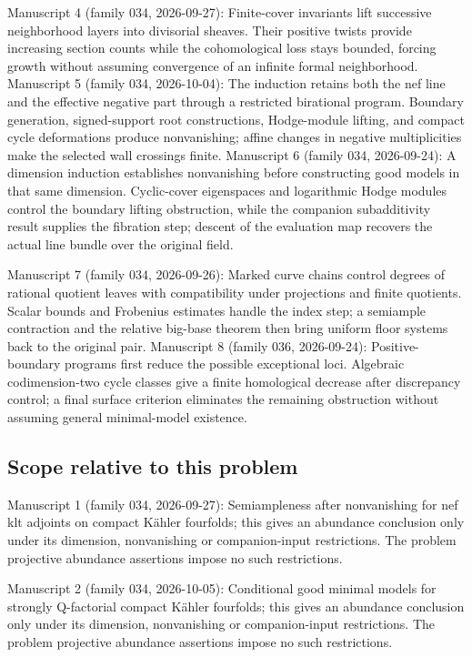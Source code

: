 \documentclass[11pt]{article}
\begin{document}
Manuscript 4 (family 034, 2026-09-27): Finite-cover invariants lift successive neighborhood layers into divisorial sheaves. Their positive twists provide increasing section counts while the cohomological loss stays bounded, forcing growth without assuming convergence of an infinite formal neighborhood. Manuscript 5 (family 034, 2026-10-04): The induction retains both the nef line and the effective negative part through a restricted birational program. Boundary generation, signed-support root constructions, Hodge-module lifting, and compact cycle deformations produce nonvanishing; affine changes in negative multiplicities make the selected wall crossings finite. Manuscript 6 (family 034, 2026-09-24): A dimension induction establishes nonvanishing before constructing good models in that same dimension. Cyclic-cover eigenspaces and logarithmic Hodge modules control the boundary lifting obstruction, while the companion subadditivity result supplies the fibration step; descent of the evaluation map recovers the actual line bundle over the original field.

Manuscript 7 (family 034, 2026-09-26): Marked curve chains control degrees of rational quotient leaves with compatibility under projections and finite quotients. Scalar bounds and Frobenius estimates handle the index step; a semiample contraction and the relative big-base theorem then bring uniform floor systems back to the original pair. Manuscript 8 (family 036, 2026-09-24): Positive-boundary programs first reduce the possible exceptional loci. Algebraic codimension-two cycle classes give a finite homological decrease after discrepancy control; a final surface criterion eliminates the remaining obstruction without assuming general minimal-model existence.

\subsection{Scope relative to this problem}
Manuscript 1 (family 034, 2026-09-27): Semiampleness after nonvanishing for nef klt adjoints on compact Kähler fourfolds; this gives an abundance conclusion only under its dimension, nonvanishing or companion-input restrictions. The problem projective abundance assertions impose no such restrictions.

Manuscript 2 (family 034, 2026-10-05): Conditional good minimal models for strongly Q-factorial compact Kähler fourfolds; this gives an abundance conclusion only under its dimension, nonvanishing or companion-input restrictions. The problem projective abundance assertions impose no such restrictions.
\end{document}
